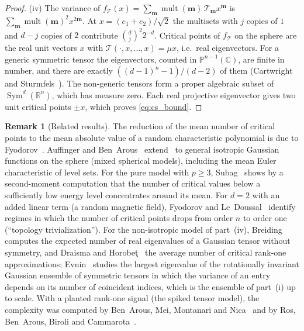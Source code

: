 \documentclass[11pt,a4paper,reqno]{amsart}
\theoremstyle{definition}
\newtheorem{remark}[theorem]{Remark}
\numberwithin{equation}{section}
\newcommand{\R}{\mathbb{R}}
\newcommand{\C}{\mathbb{C}}
\begin{document}
\begin{proof}
(iv) The variance of $f_{\mathcal{T}}(x) = \sum_{\mathbf{m}} \operatorname{mult}(\mathbf{m})\, \mathcal{T}_{\mathbf{m}} x^{\mathbf{m}}$ is $\sum_{\mathbf{m}} \operatorname{mult}(\mathbf{m})^2 x^{2\mathbf{m}}$. At $x = (e_1+e_2)/\sqrt2$ the multisets with $j$ copies of $1$ and $d-j$ copies of $2$ contribute $\binom{d}{j}^2 2^{-d}$. Critical points of $f_{\mathcal{T}}$ on the sphere are the real unit vectors $x$ with $\mathcal{T}(\cdot, x, \dots, x) = \mu x$, i.e.\ real eigenvectors. For a generic symmetric tensor the eigenvectors, counted in $\mathbb{P}^{n-1}(\C)$, are finite in number, and there are exactly $((d-1)^n - 1)/(d-2)$ of them (Cartwright and Sturmfels~\cite{cartwright2013number}). The non-generic tensors form a proper algebraic subset of $\operatorname{Sym}^d(\R^n)$, which has measure zero. Each real projective eigenvector gives two unit critical points $\pm x$, which proves \eqref{eq:cs_bound}.
\end{proof}

\begin{remark}[Related results]
\label{rem:kac_rice_literature}
The reduction of the mean number of critical points to the mean absolute value of a random characteristic polynomial is due to Fyodorov~\cite{fyodorov2004complexity}. Auffinger and Ben~Arous~\cite{auffinger2013complexity} extend~\cite{auffinger2013random} to general isotropic Gaussian functions on the sphere (mixed spherical models), including the mean Euler characteristic of level sets. For the pure model with $p \ge 3$, Subag~\cite{subag2017complexity} shows by a second-moment computation that the number of critical values below a sufficiently low energy level concentrates around its mean. For $d = 2$ with an added linear term (a random magnetic field), Fyodorov and Le~Doussal~\cite{fyodorov2014topology} identify regimes in which the number of critical points drops from order $n$ to order one (``topology trivialization''). For the non-isotropic model of part~(iv), Breiding~\cite{breiding2017expected} computes the expected number of real eigenvalues of a Gaussian tensor without symmetry, and Draisma and Horobe\c{t}~\cite{draisma2016average} the average number of critical rank-one approximations; Evnin~\cite{evnin2021melonic} studies the largest eigenvalue of the rotationally invariant Gaussian ensemble of symmetric tensors in which the variance of an entry depends on its number of coincident indices, which is the ensemble of part~(i) up to scale. With a planted rank-one signal (the spiked tensor model), the complexity was computed by Ben~Arous, Mei, Montanari and Nica~\cite{benarous2019landscape} and by Ros, Ben~Arous, Biroli and Cammarota~\cite{ros2019complex}.
\end{remark}
\end{document}
